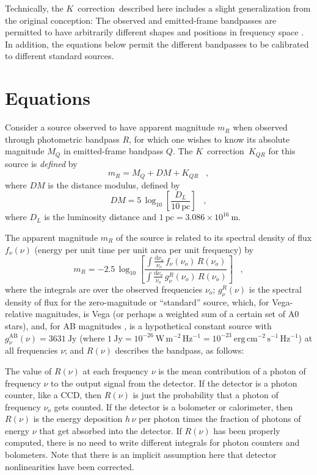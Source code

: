 \documentclass[preprint]{aastex}
\newcommand{\kcorrection}{$K$~correction}
\newcommand{\nuobs}{\nu_o}
\newcommand{\latin}[1]{\textsl{#1}}
\providecommand{\eg}{\latin{e.g.}}
\begin{document}
Technically, the \kcorrection\ described here includes a slight
generalization from the original conception: The observed and
emitted-frame bandpasses are permitted to have arbitrarily different
shapes and positions in frequency space \citep[as they are in,
\eg,][]{kim96a}.  In addition, the equations below permit the different
bandpasses to be calibrated to different standard sources.

\section{Equations}

Consider a source observed to have apparent magnitude $m_R$ when
observed through photometric bandpass $R$, for which one wishes to
know its absolute magnitude $M_Q$ in emitted-frame bandpass $Q$.  The
\kcorrection\ $K_{QR}$ for this source is \emph{defined} by
\begin{equation}
\label{eq:definition}
m_R = M_Q + DM + K_{QR} \;\;\;,
\end{equation}
where $DM$ is the distance modulus, defined by
\begin{equation}
DM = 5\,\log_{10}\left[\frac{D_L}{10~\mathrm{pc}}\right] \;\;\;,
\end{equation}
where $D_L$ is the luminosity distance \citep[\eg,][]{hogg99cosm} and
$1~\mathrm{pc}= 3.086\times 10^{16}~\mathrm{m}$.

The apparent magnitude $m_R$ of the source is related to its spectral
density of flux $f_{\nu}(\nu)$ (energy per unit time per unit area per
unit frequency) by
\begin{equation}
m_R = -2.5\,\log_{10}\left[
  \frac{\displaystyle
          \int\frac{\mathrm{d}\nuobs}{\nuobs}\,f_{\nu}(\nuobs)\,R(\nuobs)}
       {\displaystyle
          \int\frac{\mathrm{d}\nuobs}{\nuobs}\,g^R_{\nu}(\nuobs)\,R(\nuobs)}
\right] \;\;\;,
\end{equation}
where the integrals are over the observed frequencies $\nuobs$;
$g^{R}_{\nu}(\nu)$ is the spectral density of flux for the
zero-magnitude or ``standard'' source, which, for Vega-relative
magnitudes, is Vega (or perhaps a weighted sum of a certain set of A0
stars), and, for AB magnitudes \citep{oke83a}, is a hypothetical
constant source with $g^\mathrm{AB}_{\nu}(\nu)=3631~\mathrm{Jy}$
(where $1~\mathrm{Jy}= 10^{-26}~\mathrm{W\,m^{-2}\,Hz^{-1}}=
10^{-23}~\mathrm{erg\,cm^{-2}\,s^{-1}\,Hz^{-1}}$) at all frequencies
$\nu$; and $R(\nu)$ describes the bandpass, as follows:

The value of $R(\nu)$ at each frequency $\nu$ is the mean contribution
of a photon of frequency $\nu$ to the output signal from the detector.
If the detector is a photon counter, like a CCD, then $R(\nu)$ is just
the probability that a photon of frequency $\nuobs$ gets counted.  If
the detector is a bolometer or calorimeter, then $R(\nu)$ is the
energy deposition $h\,\nu$ per photon times the fraction of photons of
energy $\nu$ that get absorbed into the detector.  If $R(\nu)$ has
been properly computed, there is no need to write different integrals
for photon counters and bolometers.  Note that there is an implicit
assumption here that detector nonlinearities have been corrected.
\end{document}
